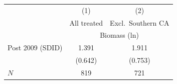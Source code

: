 \begin{tabular}{l*{2}{c}}
\hline\hline
            &\multicolumn{1}{c}{(1)}&\multicolumn{1}{c}{(2)}\\
            &\multicolumn{1}{c}{All treated}&\multicolumn{1}{c}{Excl.\ Southern CA}\\
            &\multicolumn{2}{c}{Biomass (ln)}\\
\hline
Post 2009 (SDID)        &       1.391\sym{**}       &       1.911\sym{**} \\
                        &     (0.642)               &     (0.753)   \\
\hline
\(N\)                   &         819               &         721   \\
\hline\hline
\end{tabular}
